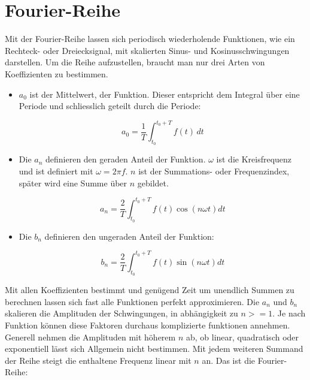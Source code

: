 %
%
%
%

\section{Fourier-Reihe\label{fourier:section:GrundlagenFourierAnalyse}}


Mit der Fourier-Reihe lassen sich periodisch wiederholende Funktionen, wie ein Rechteck- oder Dreiecksignal, mit skalierten Sinus- und Kosinusschwingungen darstellen. 
Um die Reihe aufzustellen, braucht man nur drei Arten von Koeffizienten zu bestimmen. 

\begin{itemize}
	\item $a_0$ ist der Mittelwert, der Funktion. 
	Dieser entspricht dem Integral über eine Periode und schliesslich geteilt durch die Periode: 
	
	\begin{equation}
		a_0 = \frac{1}{T} \int_{t_0}^{t_0 + T} f(t) \, dt
	\end{equation}
	
	\item Die $a_n$ definieren den geraden Anteil der Funktion. $\omega$ ist die Kreisfrequenz und ist definiert mit $\omega = 2\pi f$. 
	$n$ ist der Summations- oder Frequenzindex, später wird eine Summe über $n$ gebildet.
	
	\begin{equation}
		a_n = \frac{2}{T} \int_{t_0}^{t_0 + T} f(t) \cos\left(n\omega t\right) dt
	\end{equation}
	
	\item Die $b_n$ definieren den ungeraden Anteil der Funktion:
	
	\begin{equation}
		b_n = \frac{2}{T} \int_{t_0}^{t_0 + T} f(t) \sin\left(n\omega t\right) dt
	\end{equation}
	
\end{itemize}


Mit allen Koeffizienten bestimmt und genügend Zeit um unendlich Summen zu berechnen lassen sich fast alle Funktionen perfekt approximieren.
Die $a_n$ und $b_n$ skalieren die Amplituden der Schwingungen, in abhängigkeit zu $n>=1$. 
Je nach Funktion können diese Faktoren durchaus komplizierte funktionen annehmen.
Generell nehmen die Amplituden mit höherem $n$ ab, ob linear, quadratisch oder exponentiell lässt sich Allgemein nicht bestimmen.
Mit jedem weiteren Summand der Reihe steigt die enthaltene Frequenz linear mit $n$ an.
Das ist die Fourier-Reihe:


